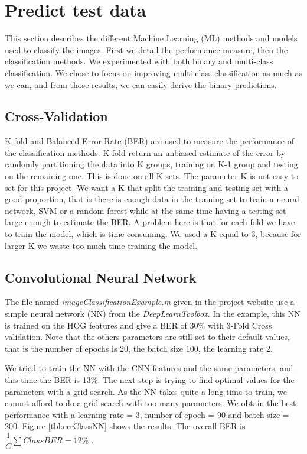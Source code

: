 \documentclass{article} %
\begin{document}
\section{Predict test data}
This section describes the different Machine Learning (ML) methods and models used to classify the images. 
First we detail the performance measure, then the classification methods.
We experimented with both binary and multi-class classification.
We chose to focus on improving multi-class classification as much as we can, and from those results, we can easily derive the binary predictions.


\subsection{Cross-Validation}

K-fold and Balanced Error Rate (BER) are used to measure the performance of the classification methods.
K-fold return an unbiased estimate of the error by randomly partitioning the data into K groups, training on K-1 group and testing on the remaining one. This is done on all K sets.
The parameter K is not easy to set for this project. 
We want a K that split the training and testing set with a good proportion, that is there is enough data in the training set to train a neural network, SVM or a random forest while at the same time having a testing set large enough to estimate the BER.
A problem here is that for each fold we have to train the model, which is time consuming. 
We used a K equal to 3, because for larger K we waste too much time training the model.

\subsection{Convolutional Neural Network}
The file named \emph{imageClassificationExample.m} given in the project website use a simple neural network (NN) from the \emph{DeepLearnToolbox}.
In the example, this NN is trained on the HOG features and give a BER of 30\% with 3-Fold Cross validation. Note that the others parameters are still set to their default values, that is the number of epochs is 20, the batch size 100, the learning rate 2.

We tried to train the NN with the CNN features and the same parameters, and this time the BER is 13\%.
The next step is trying to find optimal values for the parameters with a grid search. As the NN takes quite a long time to train, we cannot afford to do a grid search with too many parameters.
We obtain the best performance with a learning rate = 3, number of epoch = 90 and batch size = 200. 
Figure \ref{tbl:errClassNN} shows the results. The overall BER is $\dfrac{1}{C}\sum Class BER= 12\%$ . 
\end{document}
